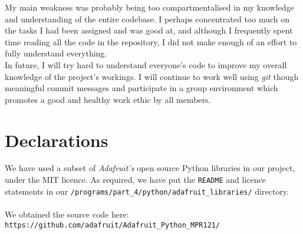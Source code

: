 \documentclass[11pt]{article}
\begin{document}
My main weakness was probably being too compartmentalised in my knowledge and understanding of the entire codebase. I perhaps concentrated too much on the tasks I had been assigned and was good at, and although I frequently spent time reading all the code in the repository, I did not make enough of an effort to fully understand everything.\\

In future, I will try hard to understand everyone's code to improve my overall knowledge of the project's workings. I will continue to work well using \textit{git} though meaningful commit messages and participate in a group environment which promotes a good and healthy work ethic by all members.

\section{Declarations}
We have used a subset of \textit{Adafruit's} open source Python libraries in our project, under the MIT licence. As required, we have put the \texttt{README} and licence statements in our \texttt{/programs/part{\_}4/python/adafruit{\_}libraries/} directory.\\ \\
We obtained the source code here:
\texttt{https://github.com/adafruit/Adafruit{\_}Python{\_}MPR121/}
\end{document}
